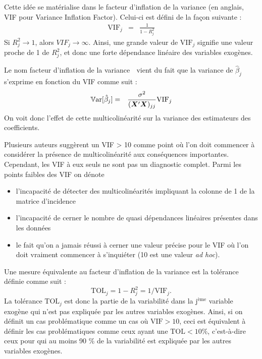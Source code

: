 Cette idée se matérialise dans le facteur d'inflation de la variance (en anglais, VIF pour Variance Inflation Factor). Celui-ci est défini de la façon suivante :
\begin{eqnarray}
  \mbox{VIF}_j &=& \frac{1}{1-R_j^2}
\end{eqnarray}
Si $R_j^2\rightarrow 1$, alors $VIF_j\rightarrow \infty$. Ainsi, une grande valeur de $\mbox{VIF}_j$ signifie une valeur proche de 1 de $R_j^2$, et donc une forte dépendance linéaire des variables exogènes.

Le nom \og facteur d'inflation de la variance \fg  $\;$ vient du fait que la variance de $\hat{\beta}_j$ s'exprime en fonction du VIF comme suit :
\begin{eqnarray*}
  \mathbb{V}\text{ar}[\hat{\beta}_j] &=& \frac{\sigma^2}{(\bm{X}'\bm{X})_{jj}} \mbox{VIF}_j
\end{eqnarray*}
On voit donc l'effet de cette multicolinéarité sur la variance des estimateurs des coefficients.

 Plusieurs
auteurs suggèrent un VIF > 10 comme point où l'on doit commencer à considérer la présence
de multicolinéarité aux conséquences importantes. Cependant, les VIF à eux seuls ne sont
pas un diagnostic complet. Parmi les points faibles des VIF on dénote
\begin{itemize}
\item [(i)]l'incapacité de détecter des multicolinéarités impliquant la colonne de 1 de la matrice d'incidence
\item [(ii)] l'incapacité de cerner le nombre de quasi dépendances linéaires présentes dans les données
\item [(iii)] le fait qu'on a jamais réussi à cerner une valeur précise pour le VIF où l'on doit vraiment commencer à s'inquiéter (10 est une valeur \textit{ ad hoc}).
\end{itemize}

\begin{remarque}
Une mesure équivalente au facteur d'inflation de la variance est la tolérance définie comme suit :
$$\mbox{TOL}_j=1-R_j^2=1/\mbox{VIF}_j.$$
La tolérance $\mbox{TOL}_j$ est donc la partie de la variabilité dans la j$^{\text{ème}}$ variable exogène qui n'est pas expliquée par les autres variables exogènes. Ainsi, si on définit un cas problématique comme un cas où $\mbox{VIF}>10$, ceci est équivalent à définir les cas problématiques comme ceux ayant une $\mbox{TOL}< 10 \%$, c'est-à-dire ceux pour qui au moins 90 \% de la variabilité est expliquée par les autres variables exogènes.
\end{remarque}

